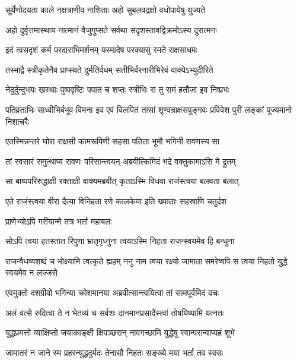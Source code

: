 \twolineshloka
{सूर्येणोदयता काले नक्षत्राणीव नाशिताः}
{अहो सुबलवद्रक्षो वधोपायेषु युज्यते} %

\twolineshloka
{अहो दुर्वृत्तमास्थाय नात्मानं वैजुगुप्सते}
{सर्वथा सदृशस्तावद्विक्रमोऽस्य दुरात्मनः} %

\twolineshloka
{इदं त्वसदृशं कर्म परदाराभिमर्शनम्}
{यस्मादेष परक्यासु रमते राक्षसाधमः} %

\twolineshloka
{तस्माद्वै स्त्रीकृतेनैव प्राप्स्यते दुर्मतिर्वधम्}
{सतीभिर्वरनारीभिरेवं वाक्येऽभ्युदीरिते} %

\twolineshloka
{नेदुर्दुन्दुभयः खस्थाः पुष्पवृष्टिः पपात च}
{शप्तः स्त्रीभिः स तु समं हतौजा इव निष्प्रभः} %

\threelineshloka
{पतिव्रताभिः साध्वीभिर्बभूव विमना इव}
{एवं विलपितं तासां शृण्वन्राक्षसपुङ्गवः}
{प्रविवेश पुरीं लङ्कां पूज्यमानो निशाचरैः} %

\twolineshloka
{एतस्मिन्नन्तरे घोरा राक्षसी कामरूपिणी}
{सहसा पतिता भूमौ भगिनी रावणस्य सा} %

\twolineshloka
{तां स्वसारं समुत्थाप्य रावणः परिसान्त्वयन्}
{अब्रवीत्किमिदं भद्रे वक्तुकामाऽसि मे द्रुतम्} %

\twolineshloka
{सा बाष्पपरिरुद्धाक्षी रक्ताक्षी वाक्यमब्रवीत्}
{कृताऽस्मि विधवा राजंस्त्वया बलवता बलात्} %

\twolineshloka
{एते राजंस्त्वया वीरा दैत्या विनिहता रणे}
{कालकेया इति ख्याताः सहस्राणि चतुर्दश} %

\onelineshloka
{प्राणेभ्योऽपि गरीयान्मे तत्र भर्ता महाबलः} %

\twolineshloka
{सोऽपि त्वया हतस्तात रिपुणा भ्रातृगृध्नुना}
{त्वयाऽस्मि निहता राजन्स्वयमेव हि बन्धुना} %

\threelineshloka
{राजन्वैधव्यशब्दं च भोक्ष्यामि त्वत्कृते ह्यहम्}
{ननु नाम त्वया रक्ष्यो जामाता समरेष्वपि}
{स त्वया निहतो युद्धे स्वयमेव न लज्जसे} %

\twolineshloka
{एवमुक्तो दशग्रीवो भगिन्या क्रोशमानया}
{अब्रवीत्सान्त्वयित्वा तां सामपूर्वमिदं वचः} %

\twolineshloka
{अलं वत्से रुदित्वा ते न भेतव्यं च सर्वशः}
{दानमानप्रसादैस्त्वां तोषयिष्यामि यत्नतः} %

\twolineshloka
{युद्धप्रमत्तो व्याक्षिप्तो जयाकाङ्क्षी क्षिपञ्छरान्}
{नावगच्छामि युद्धेषु स्वान्परान्वाप्यहं शुभे} %

\twolineshloka
{जामातरं न जाने स्म प्रहरन्युद्धदुर्मदः}
{तेनासौ निहतः सङ्ख्ये मया भर्ता तव स्वसः} %

